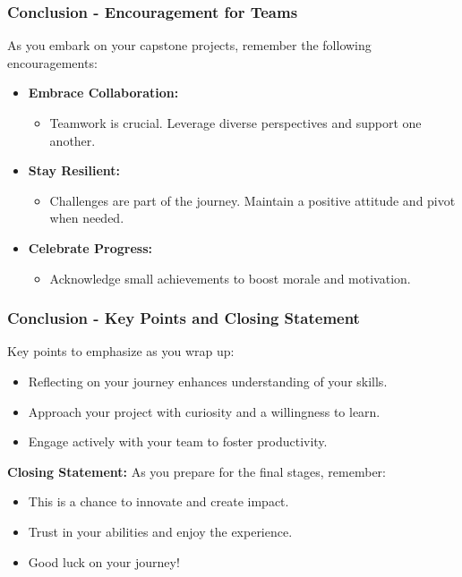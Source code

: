 \documentclass[aspectratio=169]{beamer}
\begin{document}
\begin{frame}[fragile]
  \frametitle{Conclusion - Encouragement for Teams}
  As you embark on your capstone projects, remember the following encouragements:

  \begin{itemize}
    \item \textbf{Embrace Collaboration:}
      \begin{itemize}
        \item Teamwork is crucial. Leverage diverse perspectives and support one another.
      \end{itemize}
    
    \item \textbf{Stay Resilient:}
      \begin{itemize}
        \item Challenges are part of the journey. Maintain a positive attitude and pivot when needed.
      \end{itemize}
    
    \item \textbf{Celebrate Progress:}
      \begin{itemize}
        \item Acknowledge small achievements to boost morale and motivation.
      \end{itemize}
  \end{itemize}
\end{frame}

\begin{frame}[fragile]
  \frametitle{Conclusion - Key Points and Closing Statement}
  Key points to emphasize as you wrap up:

  \begin{itemize}
    \item Reflecting on your journey enhances understanding of your skills.
    \item Approach your project with curiosity and a willingness to learn.
    \item Engage actively with your team to foster productivity.
  \end{itemize}

  \textbf{Closing Statement:} As you prepare for the final stages, remember:
  \begin{itemize}
    \item This is a chance to innovate and create impact.
    \item Trust in your abilities and enjoy the experience.
    \item Good luck on your journey!
  \end{itemize}
\end{frame}
\end{document}
